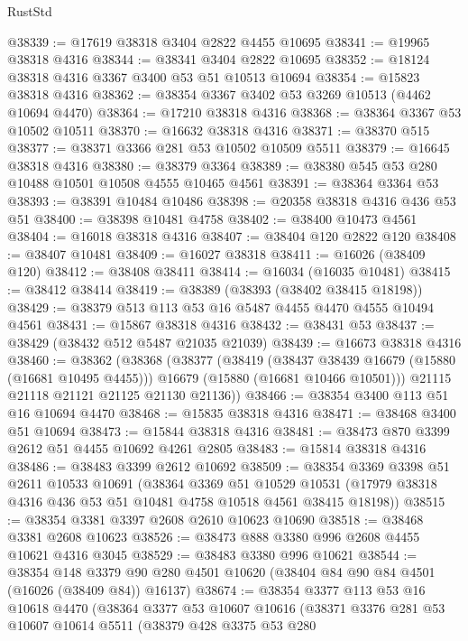 \begin{lexlean}{RustStd}
\begin{coremodule}
@38339 := @17619 @38318 @3404 @2822 @4455 @10695
@38341 := @19965 @38318 @4316
@38344 := @38341 @3404 @2822 @10695
@38352 := @18124 @38318 @4316 @3367 @3400 @53 @51 @10513 @10694
@38354 := @15823 @38318 @4316
@38362 := @38354 @3367 @3402 @53 @3269 @10513 (@4462 @10694 @4470)
@38364 := @17210 @38318 @4316
@38368 := @38364 @3367 @53 @10502 @10511
@38370 := @16632 @38318 @4316
@38371 := @38370 @515
@38377 := @38371 @3366 @281 @53 @10502 @10509 @5511
@38379 := @16645 @38318 @4316
@38380 := @38379 @3364
@38389 := @38380 @545 @53 @280 @10488 @10501 @10508 @4555 @10465 @4561
@38391 := @38364 @3364 @53
@38393 := @38391 @10484 @10486
@38398 := @20358 @38318 @4316 @436 @53 @51
@38400 := @38398 @10481 @4758
@38402 := @38400 @10473 @4561
@38404 := @16018 @38318 @4316
@38407 := @38404 @120 @2822 @120
@38408 := @38407 @10481
@38409 := @16027 @38318
@38411 := @16026 (@38409 @120)
@38412 := @38408 @38411
@38414 := @16034 (@16035 @10481)
@38415 := @38412 @38414
@38419 := @38389 (@38393 (@38402 @38415 @18198))
@38429 := @38379 @513 @113 @53 @16 @5487 @4455 @4470 @4555 @10494 @4561
@38431 := @15867 @38318 @4316
@38432 := @38431 @53
@38437 := @38429 (@38432 @512 @5487 @21035 @21039)
@38439 := @16673 @38318 @4316
@38460 := @38362
    (@38368
      (@38377
        (@38419
          (@38437 @38439 @16679 (@15880 (@16681 @10495 @4455)))
          @16679
          (@15880 (@16681 @10466 @10501)))
        @21115
        @21118
        @21121
        @21125
        @21130
        @21136))
@38466 := @38354 @3400 @113 @51 @16 @10694 @4470
@38468 := @15835 @38318 @4316
@38471 := @38468 @3400 @51 @10694
@38473 := @15844 @38318 @4316
@38481 := @38473 @870 @3399 @2612 @51 @4455 @10692 @4261 @2805
@38483 := @15814 @38318 @4316
@38486 := @38483 @3399 @2612 @10692
@38509 := @38354
    @3369
    @3398
    @51
    @2611
    @10533
    @10691
    (@38364
      @3369
      @51
      @10529
      @10531
      (@17979 @38318 @4316 @436 @53 @51 @10481 @4758 @10518 @4561 @38415 @18198))
@38515 := @38354 @3381 @3397 @2608 @2610 @10623 @10690
@38518 := @38468 @3381 @2608 @10623
@38526 := @38473 @888 @3380 @996 @2608 @4455 @10621 @4316 @3045
@38529 := @38483 @3380 @996 @10621
@38544 := @38354
    @148
    @3379
    @90
    @280
    @4501
    @10620
    (@38404 @84 @90 @84 @4501 (@16026 (@38409 @84)) @16137)
@38674 := @38354
    @3377
    @113
    @53
    @16
    @10618
    @4470
    (@38364
      @3377
      @53
      @10607
      @10616
      (@38371
        @3376
        @281
        @53
        @10607
        @10614
        @5511
        (@38379
          @428
          @3375
          @53
          @280

\end{coremodule}
\end{lexlean}
